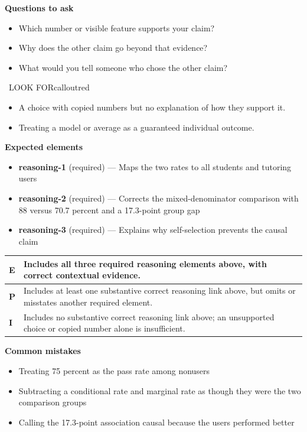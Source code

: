 \documentclass[11pt]{article}
\begin{document}
\textbf{Questions to ask}
\begin{itemize}[leftmargin=1.5em,itemsep=2pt,topsep=2pt]
  \item Which number or visible feature supports your claim?
  \item Why does the other claim go beyond that evidence?
  \item What would you tell someone who chose the other claim?
\end{itemize}

\begin{callout}{\IconWarn\ LOOK FOR}{calloutred}
\begin{itemize}[leftmargin=1.5em,itemsep=2pt,topsep=2pt]
  \item A choice with copied numbers but no explanation of how they support it.
  \item Treating a model or average as a guaranteed individual outcome.
\end{itemize}
\end{callout}


\textbf{Expected elements}
\begin{itemize}[leftmargin=1.5em,itemsep=2pt,topsep=2pt]
  \item \textbf{reasoning-1} (required) --- Maps the two rates to all students and tutoring users
  \item \textbf{reasoning-2} (required) --- Corrects the mixed-denominator comparison with 88 versus 70.7 percent and a 17.3-point group gap
  \item \textbf{reasoning-3} (required) --- Explains why self-selection prevents the causal claim
\end{itemize}

{\small\renewcommand{\arraystretch}{1.25}
\noindent\begin{tabular}{|p{0.5in}|p{5.9in}|}
\hline
\textbf{E} & Includes all three required reasoning elements above, with correct contextual evidence. \\ \hline
\textbf{P} & Includes at least one substantive correct reasoning link above, but omits or misstates another required element. \\ \hline
\textbf{I} & Includes no substantive correct reasoning link above; an unsupported choice or copied number alone is insufficient. \\ \hline
\end{tabular}}

\textbf{Common mistakes}
\begin{itemize}[leftmargin=1.5em,itemsep=2pt,topsep=2pt]
  \item Treating 75 percent as the pass rate among nonusers
  \item Subtracting a conditional rate and marginal rate as though they were the two comparison groups
  \item Calling the 17.3-point association causal because the users performed better
\end{itemize}
\end{document}
